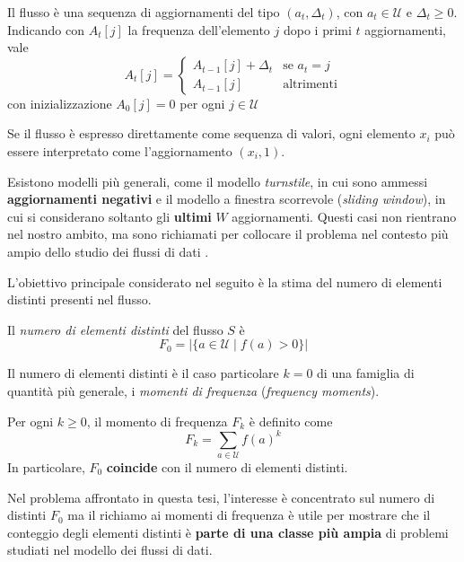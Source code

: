 \begin{definition}
Il flusso è una sequenza di aggiornamenti del tipo $(a_t,\Delta_t)$, con
$a_t \in \mathcal{U}$ e $\Delta_t \ge 0$. Indicando con $A_t[j]$ la frequenza
dell'elemento $j$ dopo i primi $t$ aggiornamenti, vale
\[
A_t[j] =
\begin{cases}
A_{t-1}[j] + \Delta_t & \text{se } a_t = j \\
A_{t-1}[j] & \text{altrimenti}
\end{cases}
\]
con inizializzazione $A_0[j] = 0$ per ogni $j \in \mathcal{U}$
\end{definition}

Se il flusso è espresso direttamente come sequenza di valori, ogni elemento
$x_i$ può essere interpretato come l'aggiornamento $(x_i,1)$.

Esistono modelli più generali, come il modello \emph{turnstile}, in cui sono ammessi \textbf{aggiornamenti negativi} 
e il modello a finestra scorrevole (\emph{sliding window}), in cui si considerano soltanto gli \textbf{ultimi} $W$ aggiornamenti.
Questi casi non rientrano nel nostro ambito, ma sono richiamati per collocare il problema
nel contesto più ampio dello studio dei flussi di dati \cite{Muthukrishnan_2005}.

L'obiettivo principale considerato nel seguito è la stima del numero di elementi distinti presenti nel flusso.

\begin{definition}
Il \emph{numero di elementi distinti} del flusso $S$ è
\[
F_0 = |\{a \in \mathcal{U} \mid f(a) > 0\}|
\]
\end{definition}

Il numero di elementi distinti è il caso particolare $k=0$ di una famiglia di quantità più generale,
i \emph{momenti di frequenza} (\emph{frequency moments}).

\begin{definition}
Per ogni $k \ge 0$, il momento di frequenza $F_k$ è definito come
\[
F_k = \sum_{a \in \mathcal{U}} f(a)^k
\]
In particolare, $F_0$ \textbf{coincide} con il numero di elementi distinti.
\end{definition}

Nel problema affrontato in questa tesi, l'interesse è concentrato sul numero di distinti $F_0$
ma il richiamo ai momenti di frequenza è utile per mostrare che il conteggio degli elementi distinti
è \textbf{parte di una classe più ampia} di problemi studiati nel modello dei flussi di dati.

